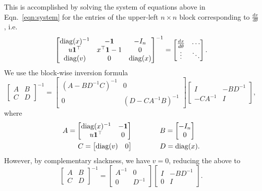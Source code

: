 \documentclass[11pt]{article}
\begin{document}
This is accomplished by solving the system of equations above in Eqn.~\ref{eqn:system}
for the entries of the upper-left $n\times n$ block corresponding to $\frac{dx}{d\theta}$,
i.e. 
\begin{equation}
\label{eqn:dsystem-matrix}
\begin{bmatrix}
\mathrm{diag}(x)^{-1} & -\mathbf{1} & -I_n \\
u\mathbf{1}^\top & x^\top\mathbf{1} - 1 & 0\\
\mathrm{diag}(v) & 0 & \mathrm{diag}(x)
\end{bmatrix}^{-1}
= 
\begin{bmatrix}
\frac{dx}{d\theta} & \cdots \\
\vdots & \ddots
\end{bmatrix}.
\end{equation}
We use the block-wise inversion formula
\begin{equation*}
\begin{bmatrix}
A & B\\
C & D
\end{bmatrix}^{-1} = \begin{bmatrix}
    (A - BD^{-1}C)^{-1} & 0\\
    0 & (D - CA^{-1}B)^{-1}
\end{bmatrix}
\begin{bmatrix}
    I & -BD^{-1}\\
    -CA^{-1} & I
\end{bmatrix},
\end{equation*}
where
\begin{align*}
A = \begin{bmatrix} \mathrm{diag}(x)^{-1} & -\mathbf{1} \\ u\mathbf{1}^\top & 0 \end{bmatrix}&\qquad\qquad
B = \begin{bmatrix}-I_n \\ 0\end{bmatrix}\\
C = \begin{bmatrix}\mathrm{diag}(v) & 0\end{bmatrix} &\qquad\qquad
D = \mathrm{diag}(x).
\end{align*}
However, by complementary slackness, we have $v = 0$, reducing the above to
\begin{equation*}
\begin{bmatrix}
A & B\\
C & D
\end{bmatrix}^{-1} = \begin{bmatrix}
    A^{-1} & 0\\
    0 & D^{-1}
\end{bmatrix}
\begin{bmatrix}
    I & -BD^{-1}\\
    0 & I
\end{bmatrix}.
\end{equation*}
\end{document}
